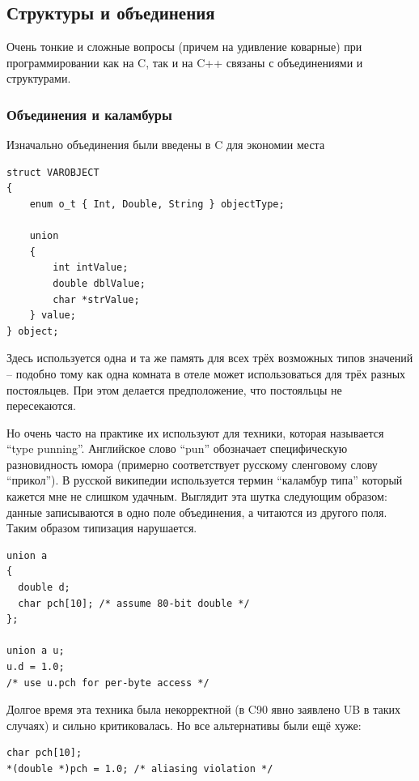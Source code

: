 \documentclass[a4paper,12pt,oneside]{article}
\begin{document}
\subsection{Структуры и объединения}

Очень тонкие и сложные вопросы (причем на удивление коварные) при программировании как на C, так и на C++ связаны с объединениями и структурами.

\subsubsection{Объединения и каламбуры}

Изначально объединения были введены в C для экономии места

\begin{lstlisting}
struct VAROBJECT
{
    enum o_t { Int, Double, String } objectType;

    union
    {
        int intValue;
        double dblValue;
        char *strValue;
    } value;
} object;
\end{lstlisting}

Здесь используется одна и та же память для всех трёх возможных типов значений -- подобно тому как одна комната в отеле может использоваться для трёх разных постояльцев. При этом делается предположение, что постояльцы не пересекаются.

Но очень часто на практике их используют для техники, которая называется ``type punning''. Английское слово ``pun'' обозначает специфическую разновидность юмора (примерно соответствует русскому сленговому слову ``прикол''). В русской википедии используется термин ``каламбур типа'' который кажется мне не слишком удачным. Выглядит эта шутка следующим образом: данные записываются в одно поле объединения, а читаются из другого поля. Таким образом типизация нарушается.

\begin{lstlisting}
union a
{
  double d;
  char pch[10]; /* assume 80-bit double */
};

union a u;
u.d = 1.0;
/* use u.pch for per-byte access */
\end{lstlisting}

Долгое время эта техника была некорректной (в C90 явно заявлено UB в таких случаях) и сильно критиковалась. Но все альтернативы были ещё хуже:

\begin{lstlisting}
char pch[10];
*(double *)pch = 1.0; /* aliasing violation */
\end{lstlisting}
\end{document}
